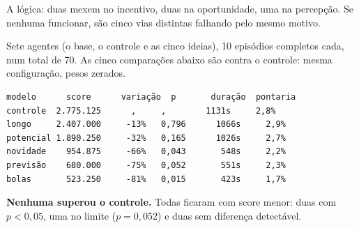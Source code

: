 \documentclass[10pt,a4paper,twoside,twocolumn]{scrartcl}
\begin{document}
\vspace{0.2em}
\begin{center}\small
{}
\end{center}
\vspace{0.1em}


A lógica: duas mexem no incentivo, duas na oportunidade, uma na
percepção. Se nenhuma funcionar, são cinco vias distintas falhando pelo
mesmo motivo.

Sete agentes (o base, o controle e as cinco ideias), 10 episódios
completos cada, num total de 70. As cinco comparações abaixo são contra
o controle: mesma configuração, pesos zerados.

\begin{verbatim}
modelo      score      variação  p       duração  pontaria
controle  2.775.125      ,     ,        1131s     2,8%
longo     2.407.000     -13%   0,796      1066s     2,9%
potencial 1.890.250     -32%   0,165      1026s     2,7%
novidade    954.875     -66%   0,043       548s     2,2%
previsão    680.000     -75%   0,052       551s     2,3%
bolas       523.250     -81%   0,015       423s     1,7%
\end{verbatim}

\textbf{Nenhuma superou o controle.} Todas ficaram com score menor: duas
com \(p < 0{,}05\), uma no limite (\(p = 0{,}052\)) e duas sem diferença
detectável.
\end{document}
